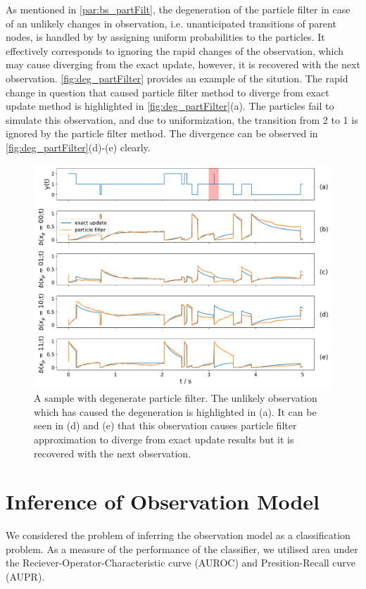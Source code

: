 As mentioned in \cref{par:bs_partFilt}, the degeneration of the particle filter in case of an unlikely changes in observation, i.e. unanticipated transitions of parent nodes, is handled by by assigning uniform probabilities to the particles. It effectively corresponds to ignoring the rapid changes of the observation, which may cause diverging from the exact update, however, it is recovered with the next observation. \autoref{fig:deg_partFilter} provides an example of the sitution. The rapid change in question that caused particle filter method to diverge from exact update method is highlighted in \autoref{fig:deg_partFilter}(a). The particles fail to simulate this observation, and due to uniformization, the transition from 2 to 1 is ignored by the particle filter method. The divergence can be observed in \autoref{fig:deg_partFilter}(d)-(e) clearly.
\begin{figure}[H]
	\begin{center}
		\includegraphics[width=.90\textwidth]{figures/degenerate_pf/belief_traj}
		\caption[A sample with degenerate particle filter]{A sample with degenerate particle filter. The unlikely observation which has caused the degeneration is highlighted in (a). It can be seen in (d) and (e) that this observation causes particle filter approximation to diverge from exact update results but it is recovered with the next observation.}
		\label{fig:deg_partFilter}
	\end{center}
\end{figure}

\section{Inference of Observation Model}
We considered the problem of inferring the observation model as a classification problem. As a measure of the performance of the classifier, we utilised area under the Reciever-Operator-Characteristic curve (AUROC) and Presition-Recall curve (AUPR). 
